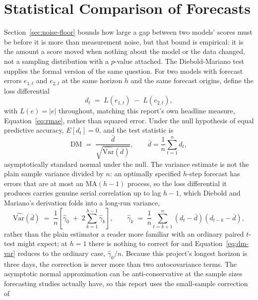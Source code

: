 \documentclass[12pt,a4paper]{report}
\begin{document}
\section{Statistical Comparison of Forecasts}
\label{sec:dmtest}

Section~\ref{sec:noise-floor} bounds how large a gap between two models'
scores must be before it is more than measurement noise, but that bound is
empirical: it is the amount a score moved when nothing about the model or
the data changed, not a sampling distribution with a $p$-value attached.
The Diebold-Mariano test \citep{diebold1995predictive} supplies the formal
version of the same question. For two models with forecast errors $e_{1,t}$
and $e_{2,t}$ at the same horizon $h$ and the same forecast origins, define
the loss differential
\begin{equation}
d_t \;=\; L(e_{1,t}) \;-\; L(e_{2,t}),
\label{eq:dm-diff}
\end{equation}
with $L(e) = |e|$ throughout, matching this report's own headline measure,
Equation~\ref{eq:rmae}, rather than squared error. Under the null hypothesis
of equal predictive accuracy, $E[d_t] = 0$, and the test statistic is
\begin{equation}
\mathrm{DM} \;=\; \frac{\bar d}{\sqrt{\widehat{\mathrm{Var}}(\bar d)}},
\qquad \bar d = \frac{1}{n}\sum_{t=1}^{n} d_t,
\label{eq:dm-stat}
\end{equation}
asymptotically standard normal under the null. The variance estimate is not
the plain sample variance divided by $n$: an optimally specified $h$-step
forecast has errors that are at most an $\mathrm{MA}(h-1)$ process, so the
loss differential it produces carries genuine serial correlation up to lag
$h-1$, which Diebold and Mariano's derivation folds into a long-run
variance,
\begin{equation}
\widehat{\mathrm{Var}}(\bar d) \;=\; \frac{1}{n}\left[\hat\gamma_0 \;+\;
2\sum_{k=1}^{h-1}\hat\gamma_k\right], \qquad
\hat\gamma_k \;=\; \frac{1}{n}\sum_{t=k+1}^{n}(d_t-\bar d)(d_{t-k}-\bar d),
\label{eq:dm-var}
\end{equation}
rather than the plain estimator a reader more familiar with an ordinary
paired $t$-test might expect; at $h=1$ there is nothing to correct for and
Equation~\ref{eq:dm-var} reduces to the ordinary case, $\hat\gamma_0/n$.
Because this project's longest horizon is three days, the correction is
never more than two autocovariance terms. The asymptotic normal
approximation can be anti-conservative at the sample sizes forecasting
studies actually have, so this report uses the small-sample correction of
\end{document}
